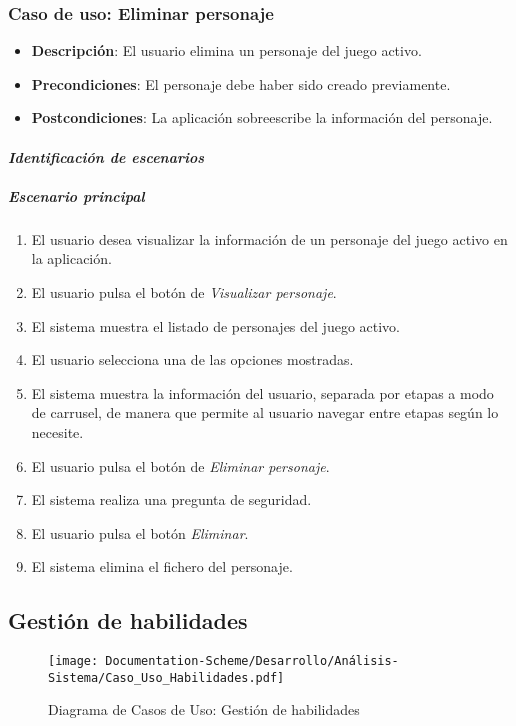 \subsubsection{Caso de uso: Eliminar personaje}
\begin{itemize}
    \item \textbf{Descripción}: El usuario elimina un personaje del juego activo.
    \item \textbf{Precondiciones}: El personaje debe haber sido creado previamente.
    \item \textbf{Postcondiciones}: La aplicación sobreescribe la información del personaje.
\end{itemize}

\paragraph{\textit{Identificación de escenarios}}
\subparagraph{Escenario principal}
\begin{enumerate}
    \item El usuario desea visualizar la información de un personaje del juego activo en la aplicación.
    \item El usuario pulsa el botón de \textit{Visualizar personaje}.
    \item El sistema muestra el listado de personajes del juego activo.
    \item El usuario selecciona una de las opciones mostradas.
    \item El sistema muestra la información del usuario, separada por etapas a modo de carrusel, de manera 
    que permite al usuario navegar entre etapas según lo necesite.
    \item El usuario pulsa el botón de \textit{Eliminar personaje}.
    \item El sistema realiza una pregunta de seguridad.
    \item El usuario pulsa el botón \textit{Eliminar}.
    \item El sistema elimina el fichero del personaje.
\end{enumerate}

\subsection{Gestión de habilidades}
\begin{figure}[H]
    \centering
    \texttt{[image: Documentation-Scheme/Desarrollo/Análisis-Sistema/Caso\_Uso\_Habilidades.pdf]}
    \caption{Diagrama de Casos de Uso: Gestión de habilidades}
    \label{Diagrama_gestión_habilidades}    
\end{figure}

